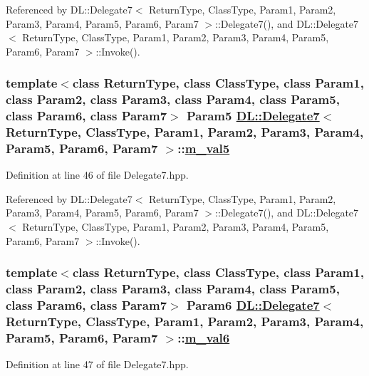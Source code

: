 Referenced by DL::Delegate7$<$ Return\-Type, Class\-Type, Param1, Param2, Param3, Param4, Param5, Param6, Param7 $>$::Delegate7(), and DL::Delegate7$<$ Return\-Type, Class\-Type, Param1, Param2, Param3, Param4, Param5, Param6, Param7 $>$::Invoke().\hypertarget{classDL_1_1Delegate7_r6}{
\subsubsection[m\_\-val5]{\setlength{\rightskip}{0pt plus 5cm}template$<$class Return\-Type, class Class\-Type, class Param1, class Param2, class Param3, class Param4, class Param5, class Param6, class Param7$>$ Param5 \hyperlink{classDL_1_1Delegate7}{DL::Delegate7}$<$ Return\-Type, Class\-Type, Param1, Param2, Param3, Param4, Param5, Param6, Param7 $>$::\hyperlink{classDL_1_1Delegate7_r6}{m\_\-val5}}}
\label{classDL_1_1Delegate7_r6}




Definition at line 46 of file Delegate7.hpp.

Referenced by DL::Delegate7$<$ Return\-Type, Class\-Type, Param1, Param2, Param3, Param4, Param5, Param6, Param7 $>$::Delegate7(), and DL::Delegate7$<$ Return\-Type, Class\-Type, Param1, Param2, Param3, Param4, Param5, Param6, Param7 $>$::Invoke().\hypertarget{classDL_1_1Delegate7_r7}{
\subsubsection[m\_\-val6]{\setlength{\rightskip}{0pt plus 5cm}template$<$class Return\-Type, class Class\-Type, class Param1, class Param2, class Param3, class Param4, class Param5, class Param6, class Param7$>$ Param6 \hyperlink{classDL_1_1Delegate7}{DL::Delegate7}$<$ Return\-Type, Class\-Type, Param1, Param2, Param3, Param4, Param5, Param6, Param7 $>$::\hyperlink{classDL_1_1Delegate7_r7}{m\_\-val6}}}
\label{classDL_1_1Delegate7_r7}




Definition at line 47 of file Delegate7.hpp.

